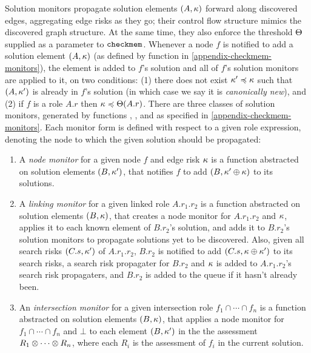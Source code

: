 Solution monitors propagate solution elements $(A,\kappa)$ forward
along discovered edges, aggregating edge risks as they go; their
control flow structure mimics the discovered graph structure. At the
same time, they also enforce the threshold $\Theta$ supplied as a
parameter to $\texttt{checkmem}$.  Whenever a node $f$ is notified to add a
solution element $(A,\kappa)$ (as defined by function
 in \autoref{appendix-checkmem-monitors}), the
element is added to $f$'s solution and all of $f$'s solution monitors
are applied to it, on two conditions: (1) there does not exist $\kappa'
\preccurlyeq \kappa$ such that $(A,\kappa')$ is already in $f$'s solution (in
which case we say it is \emph{canonically new}), and (2) if $f$ is a
role $A.r$ then $\kappa \preccurlyeq \Theta(A.r)$.  There are three classes of
solution monitors, generated by functions ,
, and  as specified in
\autoref{appendix-checkmem-monitors}.  Each monitor form is
defined with respect to a given role expression, denoting the node to
which the given solution should be propagated:
\begin{enumerate}
  \item A \emph{node monitor} for a given node $f$ and 
edge risk $\kappa$ is a function abstracted on solution 
elements $(B,\kappa')$, that notifies $f$ to add
$(B,\kappa' \oplus \kappa)$ to its solutions.  
  \item A \emph{linking monitor} for a given linked role $A.r_1.r_2$
is a function abstracted on solution elements $(B,\kappa)$, that
creates a node monitor for $A.r_1.r_2$ and $\kappa$, applies it to each
known element of $B.r_2$'s solution, and adds it to $B.r_2$'s solution
monitors to propagate solutions yet to be discovered.  Also, given all
search risks $(C.s, \kappa')$ of $A.r_1.r_2$, $B.r_2$ is notified to
add $(C.s, \kappa \oplus \kappa')$ to its search risks, a search risk
propagater for $B.r_2$ and $\kappa$ is added to $A.r_1.r_2$'s search risk
propagaters, and $B.r_2$ is added to the queue if it hasn't already
been.
  \item An \emph{intersection monitor} for a given intersection role
$f_1 \cap \cdots \cap f_n$ is a function abstracted on solution
elements $(B,\kappa)$, that applies a node monitor for $f_1 \cap \cdots
\cap f_n$ and $\bot$ to each element 
$(B,\kappa')$ in the the assessment $R_1 \otimes
\cdots \otimes R_n$, where each $R_i$ is the assessment of $f_i$ in the
current solution.
\end{enumerate}


